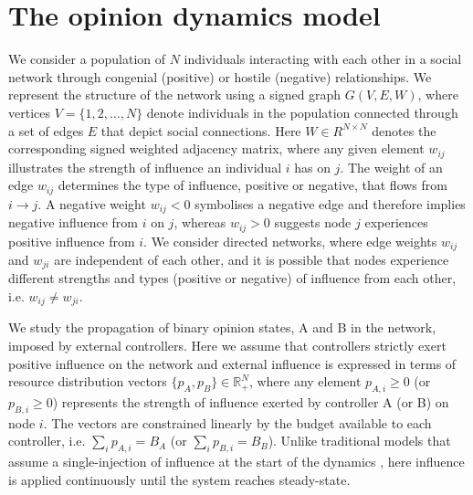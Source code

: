 \section{The opinion dynamics model}
\label{Model}
We consider a population of $N$ individuals interacting with each other in a social network through congenial (positive) or hostile (negative) relationships. We represent the structure of the network using a signed graph $G(V,E,W)$, where vertices $V = \{1,2,\ldots,N\}$ denote individuals in the population connected through a set of edges $E$ that depict social connections. Here $W \in R^{N \times N}$ denotes the corresponding signed weighted adjacency matrix, where any given element $w_{ij}$ illustrates the strength of influence an individual $i$ has on $j$.
The weight of an edge $w_{ij}$ determines the type of influence, positive or negative, that flows from $i \longrightarrow j$. A negative weight $w_{ij} < 0$ symbolises a negative edge and therefore implies negative influence from $i$ on $j$, whereas $w_{ij} > 0$ suggests node $j$ experiences positive influence from $i$. We consider directed networks, where edge weights $w_{ij} $ and $ w_{ji}$  are independent of each other, and it is possible that nodes experience different strengths and types (positive or negative) of influence from each other, i.e. $w_{ij} \neq w_{ji}$. 

We study the propagation of binary opinion states, A and B in the network, imposed by external controllers. 
Here we assume that controllers strictly exert positive influence on the network and external influence is expressed in terms of resource distribution vectors $\{p_{A},p_{B}\} \in \mathbb{R}^{N}_+$, where any element $p_{A,i} \geq 0$ (or $p_{B,i} \geq 0$) represents the strength of influence exerted by controller A (or B) on node $i$. The vectors are constrained linearly by the budget available to each controller, i.e. $\sum_{i}p_{A,i} = B_{A}$ (or $\sum_{i}p_{B,i} = B_{B}$). Unlike traditional models that assume a single-injection of influence at the start of the dynamics \cite{kempe2003maximizing,li2013influence}, here influence is applied continuously until the system reaches steady-state.

